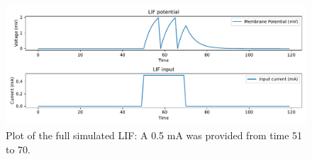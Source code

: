  			
 			
 			\begin{figure}[H]
 				\centering
 				\includegraphics[width=0.8\linewidth]{images/membranePotentialFull}
 				\caption{Plot of the full simulated LIF: A 0.5 mA was provided from time 51 to 70.}
 				\label{fig:membranepotentialfull}
 			\end{figure}
 			
 			
			
			
			
			
			
			
			
			
			
			
			
			
			
			
			




